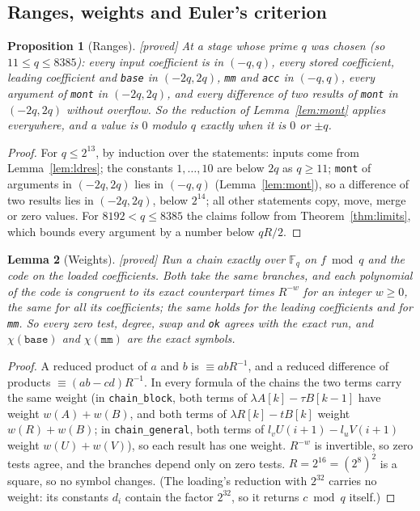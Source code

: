 \documentclass[10pt,a4paper]{article}
\newcommand{\Fq}{\mathbb{F}_q}
\newcommand{\code}[1]{\texttt{#1}}
\newcommand{\stproved}{\textsf{\small[proved]}\xspace}
\theoremstyle{plain}
\newtheorem{proposition}{Proposition}
\newtheorem{lemma}[proposition]{Lemma}
\theoremstyle{definition}
\begin{document}
\subsection{Ranges, weights and Euler's criterion}

\begin{proposition}[Ranges]\label{prop:ranges}\stproved
At a stage whose prime $q$ was chosen (so $11\le q\le8385$): every input coefficient is in $(-q,q)$, every stored coefficient, leading coefficient and
\code{base} in $(-2q,2q)$, \code{mm} and \code{acc} in $(-q,q)$, every argument of \code{mont} in $(-2q,2q)$, and every difference of two results of \code{mont} in
$(-2q,2q)$ without overflow.  So the reduction of Lemma~\ref{lem:mont} applies everywhere, and a value is $0$ modulo $q$ exactly when it is $0$ or $\pm q$.
\end{proposition}
\begin{proof}
For $q\le2^{13}$, by induction over the statements: inputs come from Lemma~\ref{lem:ldres}; the constants $1,\dots,10$ are below $2q$ as $q\ge11$; \code{mont} of
arguments in $(-2q,2q)$ lies in $(-q,q)$ (Lemma~\ref{lem:mont}), so a difference of two results lies in $(-2q,2q)$, below $2^{14}$; all other statements copy,
move, merge or zero values.  For $8192<q\le8385$ the claims follow from Theorem~\ref{thm:limits}, which bounds every argument by a number below $qR/2$.
\end{proof}

\begin{lemma}[Weights]\label{lem:weights}\stproved
Run a chain exactly over $\Fq$ on $f\bmod q$ and the code on the loaded coefficients.  Both take the same branches, and each polynomial of the code is congruent to
its exact counterpart times $R^{-w}$ for an integer $w\ge0$, the same for all its coefficients; the same holds for the leading coefficients and for \code{mm}.  So
every zero test, degree, swap and \code{ok} agrees with the exact run, and $\chi(\code{base})$ and $\chi(\code{mm})$ are the exact symbols.
\end{lemma}
\begin{proof}
A reduced product of $a$ and $b$ is $\equiv abR^{-1}$, and a reduced difference of products $\equiv(ab-cd)R^{-1}$.  In every formula of the chains the two terms carry the
same weight (in \code{chain\_block}, both terms of $\lambda A[k]-\tau B[k-1]$ have weight $w(A)+w(B)$, and both terms of $\lambda R[k]-tB[k]$ weight $w(R)+w(B)$; in
\code{chain\_general}, both terms of $l_vU(i+1)-l_uV(i+1)$ weight $w(U)+w(V)$), so each result has one weight.  $R^{-w}$ is invertible, so zero tests agree, and the
branches depend only on zero tests.  $R=2^{16}=(2^8)^2$ is a square, so no symbol changes.  (The loading's reduction with $2^{32}$ carries no weight: its
constants $d_i$ contain the factor $2^{32}$, so it returns $c\bmod q$ itself.)
\end{proof}
\end{document}
